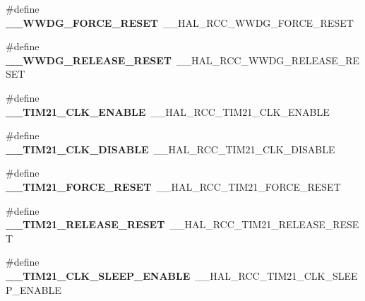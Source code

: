 \begin{DoxyCompactItemize}
\item 
\hypertarget{group___h_a_l___r_c_c___aliased_ga3f066c5b3d2b225967ac2417dae6d569}{\#define {\bfseries \-\_\-\-\_\-\-W\-W\-D\-G\-\_\-\-F\-O\-R\-C\-E\-\_\-\-R\-E\-S\-E\-T}~\-\_\-\-\_\-\-H\-A\-L\-\_\-\-R\-C\-C\-\_\-\-W\-W\-D\-G\-\_\-\-F\-O\-R\-C\-E\-\_\-\-R\-E\-S\-E\-T}\label{group___h_a_l___r_c_c___aliased_ga3f066c5b3d2b225967ac2417dae6d569}

\item 
\hypertarget{group___h_a_l___r_c_c___aliased_ga068a4fec4a2fd9ca223b4d28a0fbc6b8}{\#define {\bfseries \-\_\-\-\_\-\-W\-W\-D\-G\-\_\-\-R\-E\-L\-E\-A\-S\-E\-\_\-\-R\-E\-S\-E\-T}~\-\_\-\-\_\-\-H\-A\-L\-\_\-\-R\-C\-C\-\_\-\-W\-W\-D\-G\-\_\-\-R\-E\-L\-E\-A\-S\-E\-\_\-\-R\-E\-S\-E\-T}\label{group___h_a_l___r_c_c___aliased_ga068a4fec4a2fd9ca223b4d28a0fbc6b8}

\item 
\hypertarget{group___h_a_l___r_c_c___aliased_ga5e5f6e02491ba4544c8e5e788c9914f9}{\#define {\bfseries \-\_\-\-\_\-\-T\-I\-M21\-\_\-\-C\-L\-K\-\_\-\-E\-N\-A\-B\-L\-E}~\-\_\-\-\_\-\-H\-A\-L\-\_\-\-R\-C\-C\-\_\-\-T\-I\-M21\-\_\-\-C\-L\-K\-\_\-\-E\-N\-A\-B\-L\-E}\label{group___h_a_l___r_c_c___aliased_ga5e5f6e02491ba4544c8e5e788c9914f9}

\item 
\hypertarget{group___h_a_l___r_c_c___aliased_ga73cc7df88569f682f8f5dafb8fa76fab}{\#define {\bfseries \-\_\-\-\_\-\-T\-I\-M21\-\_\-\-C\-L\-K\-\_\-\-D\-I\-S\-A\-B\-L\-E}~\-\_\-\-\_\-\-H\-A\-L\-\_\-\-R\-C\-C\-\_\-\-T\-I\-M21\-\_\-\-C\-L\-K\-\_\-\-D\-I\-S\-A\-B\-L\-E}\label{group___h_a_l___r_c_c___aliased_ga73cc7df88569f682f8f5dafb8fa76fab}

\item 
\hypertarget{group___h_a_l___r_c_c___aliased_ga6d2dbc31d955310a9360e55fe7748065}{\#define {\bfseries \-\_\-\-\_\-\-T\-I\-M21\-\_\-\-F\-O\-R\-C\-E\-\_\-\-R\-E\-S\-E\-T}~\-\_\-\-\_\-\-H\-A\-L\-\_\-\-R\-C\-C\-\_\-\-T\-I\-M21\-\_\-\-F\-O\-R\-C\-E\-\_\-\-R\-E\-S\-E\-T}\label{group___h_a_l___r_c_c___aliased_ga6d2dbc31d955310a9360e55fe7748065}

\item 
\hypertarget{group___h_a_l___r_c_c___aliased_ga9058ce5ea35581c862efa9d0be0a991e}{\#define {\bfseries \-\_\-\-\_\-\-T\-I\-M21\-\_\-\-R\-E\-L\-E\-A\-S\-E\-\_\-\-R\-E\-S\-E\-T}~\-\_\-\-\_\-\-H\-A\-L\-\_\-\-R\-C\-C\-\_\-\-T\-I\-M21\-\_\-\-R\-E\-L\-E\-A\-S\-E\-\_\-\-R\-E\-S\-E\-T}\label{group___h_a_l___r_c_c___aliased_ga9058ce5ea35581c862efa9d0be0a991e}

\item 
\hypertarget{group___h_a_l___r_c_c___aliased_ga92b381109bd6db49c8ad5a607ed3a99b}{\#define {\bfseries \-\_\-\-\_\-\-T\-I\-M21\-\_\-\-C\-L\-K\-\_\-\-S\-L\-E\-E\-P\-\_\-\-E\-N\-A\-B\-L\-E}~\-\_\-\-\_\-\-H\-A\-L\-\_\-\-R\-C\-C\-\_\-\-T\-I\-M21\-\_\-\-C\-L\-K\-\_\-\-S\-L\-E\-E\-P\-\_\-\-E\-N\-A\-B\-L\-E}\label{group___h_a_l___r_c_c___aliased_ga92b381109bd6db49c8ad5a607ed3a99b}


\end{DoxyCompactItemize}
